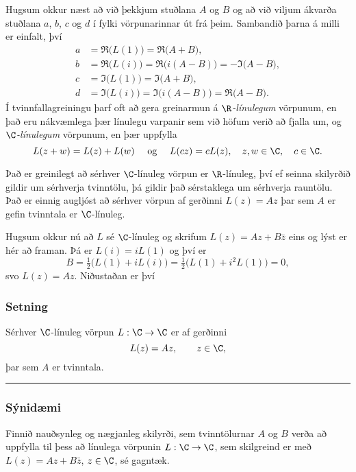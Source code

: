 Hugsum okkur næst að við þekkjum stuðlana  $A$ og $B$ og
að við viljum ákvarða stuðlana $a$, $b$, $c$ og $d$ í 
fylki vörpunarinnar út frá þeim. Sambandið þarna á milli er
einfalt, því
\begin{align*}
a&=\Re\big(L(1)\big)=\Re\big(A+B\big), \\
b&=\Re\big(L(i)\big)=\Re\big(i(A-B)\big)=-\Im\big(A-B\big),\\
c&=\Im\big(L(1)\big)=\Im\big(A+B\big),\\
d&=\Im\big(L(i)\big)=\Im\big(i(A-B)\big)=\Re\big(A-B\big).
\end{align*}
Í tvinnfallagreiningu þarf oft að gera greinarmun á {\it
$\R$-línulegum}
vörpunum, en það eru nákvæmlega þær línulegu varpanir sem við höfum
verið að fjalla um, og {\it $\C$-línulegum} vörpunum, en þær uppfylla
\begin{equation*}
L(z+w)=L(z)+L(w) \quad \text{ og } \quad 
L(cz)=cL(z), \quad z,w\in \C, \quad c\in \C.
\end{equation*}


Það er greinilegt að sérhver $\C$-línuleg vörpun er $\R$-línuleg, því ef
seinna skilyrðið gildir um sérhverja tvinntölu, þá gildir það sérstaklega um
sérhverja rauntölu.  Það er einnig augljóst að sérhver vörpun af
gerðinni $L(z)=Az$ þar sem $A$ er gefin tvinntala er $\C$-línuleg.


Hugsum okkur nú að $L$ sé $\C$-línuleg og skrifum
$L(z)=Az+B\bar z$ eins og lýst er hér að framan.  Þá er 
$L(i)=iL(1)$ og því er 
$$
B=\tfrac 12\big(L(1)+iL(i)\big)= \tfrac 12\big(L(1)+i^2L(1)\big)=0,
$$
svo $L(z)=Az$.  Niðustaðan er því 

\subsubsection{Setning} Sérhver $\C$-línuleg vörpun $L:\C\to \C$ er af gerðinni
$$
L(z)=Az, \qquad z\in \C,
$$
þar sem $A$ er tvinntala.


\bigskip\hrule\bigskip

\subsubsection{Sýnidæmi}  Finnið nauðsynleg og nægjanleg skilyrði, sem tvinntölurnar
$A$ og $B$ verða að uppfylla til þess að línulega vörpunin
$L:\C\to\C$,  sem skilgreind er með $L(z)=Az+B\bar z$, $z\in \C$,
sé gagntæk.  

